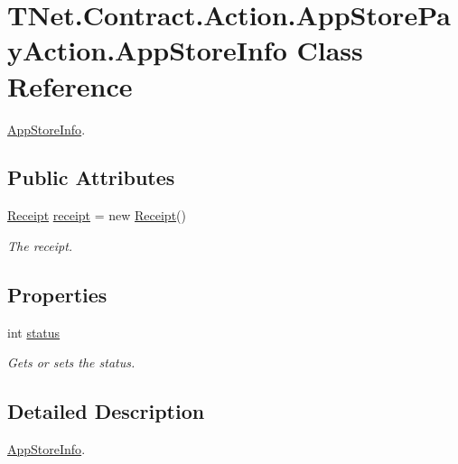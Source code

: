 \hypertarget{class_t_net_1_1_contract_1_1_action_1_1_app_store_pay_action_1_1_app_store_info}{}\section{T\+Net.\+Contract.\+Action.\+App\+Store\+Pay\+Action.\+App\+Store\+Info Class Reference}
\label{class_t_net_1_1_contract_1_1_action_1_1_app_store_pay_action_1_1_app_store_info}


\mbox{\hyperlink{class_t_net_1_1_contract_1_1_action_1_1_app_store_pay_action_1_1_app_store_info}{App\+Store\+Info}}.  


\subsection*{Public Attributes}
\begin{DoxyCompactItemize}
\item 
\mbox{\hyperlink{class_t_net_1_1_contract_1_1_action_1_1_app_store_pay_action_1_1_receipt}{Receipt}} \mbox{\hyperlink{class_t_net_1_1_contract_1_1_action_1_1_app_store_pay_action_1_1_app_store_info_a5ff07b51acf5dfb38a7899e8fc313a31}{receipt}} = new \mbox{\hyperlink{class_t_net_1_1_contract_1_1_action_1_1_app_store_pay_action_1_1_receipt}{Receipt}}()
\begin{DoxyCompactList}\small\item\em The receipt. \end{DoxyCompactList}\end{DoxyCompactItemize}
\subsection*{Properties}
\begin{DoxyCompactItemize}
\item 
int \mbox{\hyperlink{class_t_net_1_1_contract_1_1_action_1_1_app_store_pay_action_1_1_app_store_info_a1722cdd28a0e8d1c3271793b5027e0da}{status}}
\begin{DoxyCompactList}\small\item\em Gets or sets the status. \end{DoxyCompactList}\end{DoxyCompactItemize}


\subsection{Detailed Description}
\mbox{\hyperlink{class_t_net_1_1_contract_1_1_action_1_1_app_store_pay_action_1_1_app_store_info}{App\+Store\+Info}}. 



